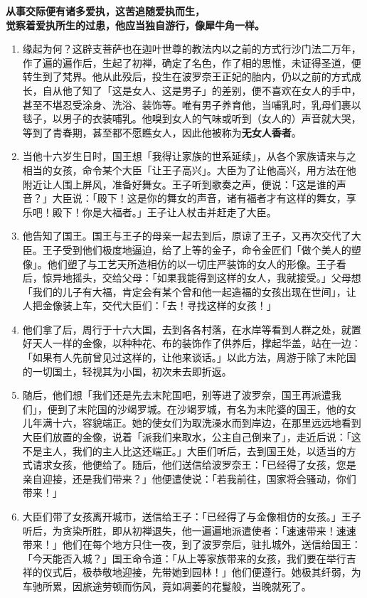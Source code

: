 \textbf{从事交际便有诸多爱执，这苦追随爱执而生，\\}
\textbf{觉察着爱执所生的过患，他应当独自游行，像犀牛角一样。}

\begin{enumerate}\item 缘起为何？这辟支菩萨也在迦叶世尊的教法内以之前的方式行沙门法二万年，作了遍的遍作后，生起了初禅，确定了名色，作了相的思惟，未证得圣道，便转生到了梵界。他从此殁后，投生在波罗奈王正妃的胎内，仍以之前的方式成长，自从他了知了「这是女人、这是男子」的差别，便不喜欢在女人的手中，甚至不堪忍受涂身、洗浴、装饰等。唯有男子养育他，当哺乳时，乳母们裹以毯子，以男子的衣装哺乳。他嗅到女人的气味或听到（女人的）声音就大哭，等到了青春期，甚至都不愿瞧女人，因此他被称为\textbf{无女人香者}。
\item 当他十六岁生日时，国王想「我得让家族的世系延续」，从各个家族请来与之相当的女孩，命令某个大臣「让王子高兴」。大臣为了让他高兴，用方法在他附近让人围上屏风，准备好舞女。王子听到歌奏之声，便说：「这是谁的声音？」大臣说：「殿下！这是你的舞女的声音，诸有福者才有这样的舞女，享乐吧！殿下！你是大福者。」王子让人杖击并赶走了大臣。
\item 他告知了国王。国王与王子的母亲一起去到后，原谅了王子，又再次交代了大臣。王子受到他们极度地逼迫，给了上等的金子，命令金匠们「做个美人的塑像」。他们塑了与工艺天所造相仿的以一切庄严装饰的女人的形像。王子看后，惊异地摇头，交给父母：「如果我能得到这样的女人，我就接受。」父母想「我们的儿子有大福，肯定会有某个曾和他一起造福的女孩出现在世间」，让人把金像装上车，交代大臣们：「去！寻找这样的女孩！」
\item 他们拿了后，周行于十六大国，去到各各村落，在水岸等看到人群之处，就置好天人一样的金像，以种种花、布的装饰作了供养后，撑起华盖，站在一边：「如果有人先前曾见过这样的，让他来谈话。」以此方法，周游于除了末陀国的一切国土，轻视其为小国，初次未去即折返。
\item 随后，他们想「我们还是先去末陀国吧，别等进了波罗奈，国王再派遣我们」，便到了末陀国的沙竭罗城。在沙竭罗城，有名为末陀婆的国王，他的女儿年满十六，容貌端正。她的使女们为取洗澡水而到岸边，在那里远远地看到大臣们放置的金像，说着「派我们来取水，公主自己倒来了」，走近后说：「这不是主人，我们的主人比这还端正。」大臣们听后，去到国王处，以适当的方式请求女孩，他便给了。随后，他们送信给波罗奈王：「已经得了女孩，您是亲自迎接，还是我们带来？」他便遣使说：「若我前往，国家将会骚动，你们带来！」
\item 大臣们带了女孩离开城市，送信给王子：「已经得了与金像相仿的女孩。」王子听后，为贪染所胜，即从初禅退失，他一遍遍地派遣使者：「速速带来！速速带来！」他们在每个地方只住一夜，到了波罗奈后，驻扎城外，送信给国王：「今天能否入城？」国王命令道：「从上等家族带来的女孩，我们要在举行吉祥的仪式后，极恭敬地迎接，先带她到园林！」他们便遵行。她极其纤弱，为车驰所累，因旅途劳顿而伤风，竟如凋萎的花鬘般，当晚就死了。

\end{enumerate}
